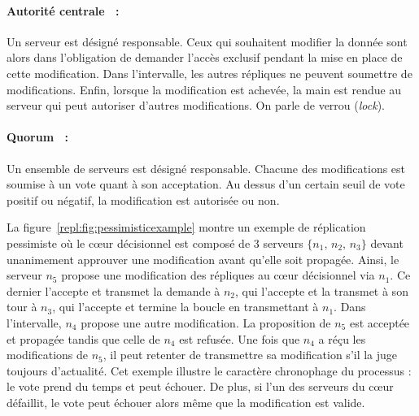 \paragraph{Autorité centrale~\cite{alsberg1976principle} :} Un serveur est
désigné responsable. Ceux qui souhaitent modifier la donnée sont alors dans
l'obligation de demander l'accès exclusif pendant la mise en place de cette
modification. Dans l'intervalle, les autres répliques ne peuvent soumettre de
modifications. Enfin, lorsque la modification est achevée, la main est rendue au
serveur qui peut autoriser d'autres modifications. On parle de verrou
(\emph{lock}).

\paragraph{Quorum~\cite{gifford1979weighted} :} Un ensemble de serveurs est
désigné responsable. Chacune des modifications est soumise à un vote quant à son
acceptation. Au dessus d'un certain seuil de vote positif ou négatif, la
modification est autorisée ou non.



\begin{figure*}
  \centering
  \hspace{40pt}
  \hspace{10pt}
  \caption{\label{repl:fig:pessimisticexample} Exemple de quorum en réplication
    pessimiste. La modification de $n_5$ est propagée.}
\end{figure*}

La figure~\ref{repl:fig:pessimisticexample} montre un exemple de réplication
pessimiste où le cœur décisionnel est composé de 3 serveurs
$\{n_1,\, n_2,\, n_3\}$ devant unanimement approuver une modification avant
qu'elle soit propagée. Ainsi, le serveur $n_5$ propose une modification des
répliques au cœur décisionnel via $n_1$. Ce dernier l'accepte et transmet la
demande à $n_2$, qui l'accepte et la transmet à son tour à $n_3$, qui l'accepte
et termine la boucle en transmettant à $n_1$.  Dans l'intervalle, $n_4$ propose
une autre modification. La proposition de $n_5$ est acceptée et propagée tandis
que celle de $n_4$ est refusée. Une fois que $n_4$ a réçu les modifications de
$n_5$, il peut retenter de transmettre sa modification s'il la juge toujours
d'actualité. Cet exemple illustre le caractère chronophage du processus : le
vote prend du temps et peut échouer. De plus, si l'un des serveurs du cœur
défaillit, le vote peut échouer alors même que la modification est valide.


